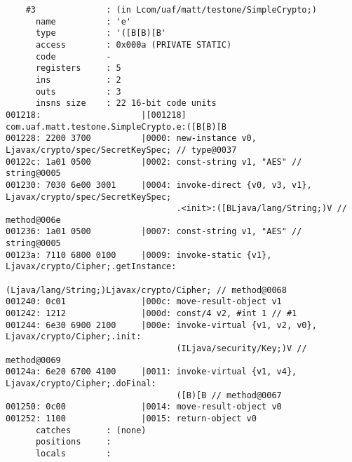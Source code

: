 \begin{lstlisting}
    #3              : (in Lcom/uaf/matt/testone/SimpleCrypto;)
      name          : 'e'
      type          : '([B[B)[B'
      access        : 0x000a (PRIVATE STATIC)
      code          -
      registers     : 5
      ins           : 2
      outs          : 3
      insns size    : 22 16-bit code units
001218:                    |[001218] com.uaf.matt.testone.SimpleCrypto.e:([B[B)[B
001228: 2200 3700          |0000: new-instance v0, Ljavax/crypto/spec/SecretKeySpec; // type@0037
00122c: 1a01 0500          |0002: const-string v1, "AES" // string@0005
001230: 7030 6e00 3001     |0004: invoke-direct {v0, v3, v1}, Ljavax/crypto/spec/SecretKeySpec;
                                  .<init>:([BLjava/lang/String;)V // method@006e
001236: 1a01 0500          |0007: const-string v1, "AES" // string@0005
00123a: 7110 6800 0100     |0009: invoke-static {v1}, Ljavax/crypto/Cipher;.getInstance:
                                  (Ljava/lang/String;)Ljavax/crypto/Cipher; // method@0068
001240: 0c01               |000c: move-result-object v1
001242: 1212               |000d: const/4 v2, #int 1 // #1
001244: 6e30 6900 2100     |000e: invoke-virtual {v1, v2, v0}, Ljavax/crypto/Cipher;.init:
                                  (ILjava/security/Key;)V // method@0069
00124a: 6e20 6700 4100     |0011: invoke-virtual {v1, v4}, Ljavax/crypto/Cipher;.doFinal:
                                  ([B)[B // method@0067
001250: 0c00               |0014: move-result-object v0
001252: 1100               |0015: return-object v0
      catches       : (none)
      positions     :
      locals        :


\end{lstlisting}
